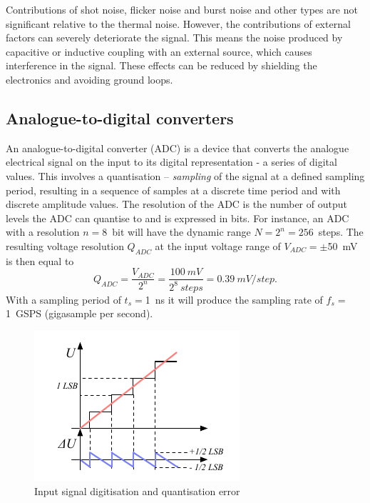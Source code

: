 \documentclass[twoside,12pt]{packages/mytustyle}  %
\begin{document}
Contributions of shot noise, flicker noise and burst noise and other types are not significant relative to the thermal noise. However, the contributions of external factors can severely deteriorate the signal. This means the noise produced by capacitive or inductive coupling with an external source, which causes interference in the signal. These effects can be reduced by shielding the electronics and avoiding ground loops. 

\subsection{Analogue-to-digital converters}
An analogue-to-digital converter (ADC) is a device that converts the analogue electrical signal on the input to its digital representation - a series of digital values. This involves a quantisation -- \emph{sampling} of the signal at a defined sampling period, resulting in a sequence of samples at a discrete time period and with discrete amplitude values. The resolution of the ADC is the number of output levels the ADC can quantise to and is expressed in bits. For instance, an ADC with a resolution $n=8$~bit will have the dynamic range $N=2^n=256$~steps. The resulting voltage resolution $Q_{ADC}$ at the input voltage range of $V_{ADC}=\pm$50~mV is then equal to 
\begin{equation}
\label{eq:mvpercnt}
Q_{ADC}=\frac{V_{ADC}}{2^{n}}  = \frac{100~mV}{2^8~steps} = 0.39~mV/step.
\end{equation} 
With a sampling period of $t_s=$1~ns it will produce the sampling rate of $f_s=$1~GSPS (gigasample per second).
\begin{figure}[!t]
\begin{center}
\includegraphics[width=0.55\linewidth]{plots/qerr}
\caption{Input signal digitisation and quantisation error}
\label{fig:qerr}
\end{center}
\end{figure}
\end{document}
